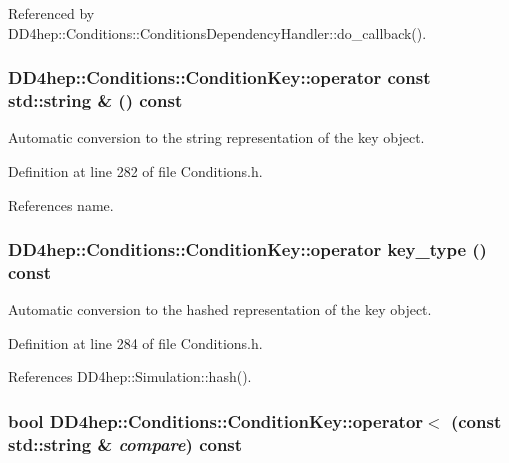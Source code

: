 Referenced by DD4hep::Conditions::ConditionsDependencyHandler::do\_\-callback().\hypertarget{class_d_d4hep_1_1_conditions_1_1_condition_key_ae7b28eefcfb2efc278c5e3b89ee1fd51}{
\subsubsection[{operator const std::string \&}]{\setlength{\rightskip}{0pt plus 5cm}DD4hep::Conditions::ConditionKey::operator const std::string \& () const}}
\label{class_d_d4hep_1_1_conditions_1_1_condition_key_ae7b28eefcfb2efc278c5e3b89ee1fd51}


Automatic conversion to the string representation of the key object. 

Definition at line 282 of file Conditions.h.

References name.\hypertarget{class_d_d4hep_1_1_conditions_1_1_condition_key_a4d7d45150a10b6e04db3343f9fb1ba6d}{
\subsubsection[{operator key\_\-type}]{\setlength{\rightskip}{0pt plus 5cm}DD4hep::Conditions::ConditionKey::operator {\bf key\_\-type} () const}}
\label{class_d_d4hep_1_1_conditions_1_1_condition_key_a4d7d45150a10b6e04db3343f9fb1ba6d}


Automatic conversion to the hashed representation of the key object. 

Definition at line 284 of file Conditions.h.

References DD4hep::Simulation::hash().\hypertarget{class_d_d4hep_1_1_conditions_1_1_condition_key_ab336cbe9c3bc6479aa7c282df6e29e66}{
\subsubsection[{operator$<$}]{\setlength{\rightskip}{0pt plus 5cm}bool DD4hep::Conditions::ConditionKey::operator$<$ (const std::string \& {\em compare}) const}}
\label{class_d_d4hep_1_1_conditions_1_1_condition_key_ab336cbe9c3bc6479aa7c282df6e29e66}


